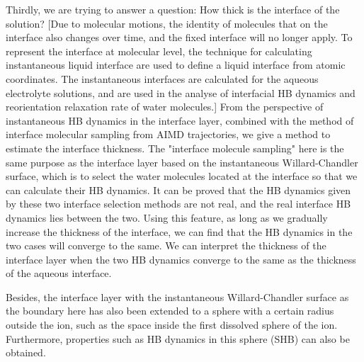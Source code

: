 Thirdly, we are trying to answer a question: How thick is the interface of the solution? 
[Due to molecular motions, the identity of molecules that on the interface also changes over time\cite{Willard2010}, and the fixed interface will no longer apply. 
To represent the interface at molecular level, the technique for calculating instantaneous liquid interface are used to define a liquid interface from atomic coordinates.
The instantaneous interfaces are calculated for the aqueous electrolyte solutions, and are used in the analyse of interfacial HB dynamics
and reorientation relaxation rate of water molecules.]
From the perspective of instantaneous HB dynamics in the interface layer, combined with the method of interface molecular sampling from AIMD trajectories,
we give a method to estimate the interface thickness. The "interface molecule sampling" here is the same purpose as the interface layer 
based on the instantaneous Willard-Chandler surface, which is to select the water molecules located at the interface so that we can calculate their HB dynamics. 
It can be proved that the HB dynamics given by these two interface selection methods are not real, and the real interface HB dynamics lies between the two. 
Using this feature, as long as we gradually increase the thickness of the interface, we can find that the HB dynamics in the two cases will converge to the same. 
We can interpret the thickness of the interface layer when the two HB dynamics converge to the same as the thickness of the aqueous interface.

Besides, the interface layer with the instantaneous Willard-Chandler surface as the boundary here has also been extended to a sphere with a certain radius outside the ion, 
such as the space inside the first dissolved sphere of the ion. Furthermore, properties such as HB dynamics in this sphere (SHB) can also be obtained.


